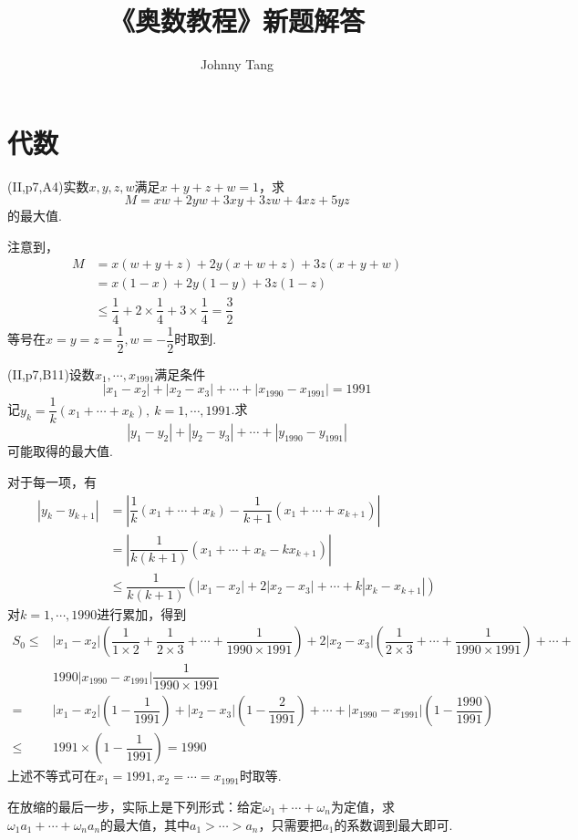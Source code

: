 \documentclass[cn,hazy,black,10pt,normal]{elegantnote}
\title{《奥数教程》新题解答}
\author{Johnny Tang}
\institute{DEEP Team}
\date{\zhtoday}
\newcommand{\ssb}[1]{\left( #1 \right)}
\begin{document}
\maketitle

\chapter{代数}

\begin{problem}
	(II,p7,A4)实数$x,y,z,w$满足$x+y+z+w=1$，求$$M=xw+2yw+3xy+3zw+4xz+5yz$$的最大值.
\end{problem}
\begin{solution}
	注意到，
	\begin{align*}
		M &= x(w+y+z)+2y(x+w+z)+3z(x+y+w) \\
		&= x(1-x) + 2y(1-y) + 3z(1-z) \\
		&\leq \dfrac{1}{4} + 2\times \dfrac{1}{4} + 3\times \dfrac{1}{4} = \dfrac{3}{2}
	\end{align*}
	等号在$x=y=z=\dfrac{1}{2},w=-\dfrac{1}{2}$时取到.
\end{solution}

\begin{problem}
	(II,p7,B11)设数$x_1,\cdots ,x_{1991}$满足条件$$|x_1-x_2| + |x_2-x_3| + \cdots + |x_{1990}-x_{1991}|=1991$$
	记$y_k=\dfrac{1}{k}(x_1+ \cdots +x_k),~k=1, \cdots ,1991$.求$$|y_1-y_2|+|y_2-y_3|+\cdots + |y_{1990}-y_{1991}|$$可能取得的最大值.
\end{problem}
\begin{solution}
	对于每一项，有
	\begin{align*}
		|y_k-y_{k+1}| &= \left| \dfrac{1}{k}(x_1+\cdots +x_k)-\dfrac{1}{k+1}(x_1+\cdots +x_{k+1}) \right| \\
		&= \left| \dfrac{1}{k(k+1)}(x_1+ \cdots + x_k-kx_{k+1}) \right| \\
		&\leq \dfrac{1}{k(k+1)}(|x_1-x_2|+2|x_2-x_3|+\cdots +k|x_k-x_{k+1}|)
	\end{align*}
	对$k=1, \cdots ,1990$进行累加，得到
	\begin{align*}
		S_0 \leq &|x_1-x_2|\ssb{ \dfrac{1}{1\times 2}+\dfrac{1}{2\times 3}+\cdots +\dfrac{1}{1990\times 1991} }+2|x_2-x_3|\ssb{\dfrac{1}{2\times 3}+\cdots +\dfrac{1}{1990\times 1991}} + \cdots + \\
		&1990|x_{1990}-x_{1991}|\dfrac{1}{1990 \times 1991} \\
		=& |x_1-x_2|\ssb{1-\dfrac{1}{1991}} + |x_2-x_3|\ssb{1-\dfrac{2}{1991}} + \cdots + |x_{1990}-x_{1991}|\ssb{1-\dfrac{1990}{1991}} \\
		\leq &1991 \times \ssb{1-\dfrac{1}{1991}} = 1990
	\end{align*}
	上述不等式可在$x_1=1991,x_2=\cdots =x_{1991}$时取等.
\end{solution}
\begin{remark}
	在放缩的最后一步，实际上是下列形式：给定$\omega _1+\cdots +\omega _n$为定值，求$\omega _1a_1+\cdots +\omega _na_n$的最大值，其中$a_1 > \cdots > a_n$，只需要把$a_1$的系数调到最大即可.
\end{remark}
\end{document}
